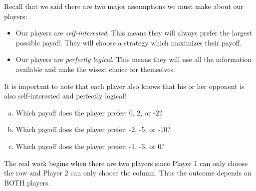 





Recall that we said there are two major assumptions we must make about our players:
\begin{itemize}
\item Our players are \emph{self-interested}. This means they will always prefer the largest  possible payoff. They will choose a strategy which maximizes their payoff.
\item Our players are \emph{perfectly logical}. This means they will use all the information available and make the wisest choice for themselves.
\end{itemize}
It is important to note that each player also knows that his or her opponent is also self-interested and perfectly logical!

\begin{xca}
\begin{enumerate}[(a)]
\item Which payoff does the player prefer: 0, 2, or -2?
\item Which payoff does the player prefer: -2, -5, or -10?
\item Which payoff does the player prefer: -1, -3, or 0?
\end{enumerate}
\end{xca}


The real work begins when there are two players since Player 1 can only choose the row and Player 2 can only choose the column. Thus the outcome depends on BOTH players. 


